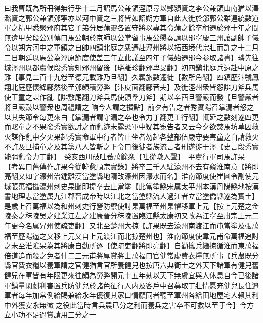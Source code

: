 曰我曹既為所冊得無行乎十二月詔馬公兼領涇原尋以鄭潁資之李公兼領山南猶以澤潞資之郭公兼領邠寜亦以河中資之三將皆如詔朔方軍自此大徙於邠郭公雖連統數道軍之精甲悉聚邠府其它子弟分居蒲靈各置守將以專其令蒲之餘卒稍遷於邠十年之間無遺甲矣段公别傳曰馬公朝於京師以公掌留事馬公懇奏請以邠寜慶三州讓副帥子儀令以朔方河中之軍鎮之自帥四鎮北庭之衆遷赴涇州將以拓西境代宗壯而許之十二月二日朝廷以馬公為涇原節度使盖三年立此議至四年子儀始遷邠今参取諸書】璘先往城涇州以都虞候段秀實知邠州留後【璘離珍翻邠卑旻翻】初四鎭北庭兵遠赴中原之難【事見二百十九卷至德元載難乃旦翻】久羈旅數遷徙【數所角翻】四鎮歷汴虢鳳翔北庭歷懷絳鄜然後至邠頗積勞弊【汴皮面翻鄜音夫】及徙涇州衆皆怨誹刀斧兵馬使王童之謀作亂【誹敷尾翻刀斧兵馬使領羣刀斧】期以辛酉旦警嚴而發【旦警嚴者將旦嚴鼔以警衆也周禮謂之晌今人謂之攅點】前夕有告之者秀實陽召掌漏者怒之以其失節令每更來白【掌漏者謂守漏之卒也令力丁翻更工行翻】輒延之數刻遂四更而曙童之不果發秀實欲討之而亂迹未露恐軍中疑其寃告者又云今夕欲焚馬坊草因救火謀作亂中夕火果起秀實命軍中行者皆止坐者勿起各整部伍嚴守要害童之白請救火不許及旦捕童之及其黨八人皆斬之下令曰後徙者族流言者刑遂徙于涇【史言段秀實能弭亂令力丁翻】　癸亥西川破吐蕃萬餘衆【吐從暾入聲】　平盧行軍司馬許杲　【考異曰舊傳作許果今從韓愈順宗實錄】將卒三千人駐濠州不去有窺淮南意【將即亮翻又如字濠州治鍾離漢當塗縣地隋改濠州因濠水而名】淮南節度使崔圓令副使元城張萬福攝濠州刺史杲聞即提卒去止當塗【此當塗縣宋属太平州本漢丹陽縣地按漢書地理志當塗属九江郡晉成帝時以江北之當塗縣流人過江者立當塗僑縣遂為實土】是歲上召萬福以為和州刺史行營防禦使討杲萬福至州杲懼移軍上元【按上元楚之金陵秦之秣陵吳之建業江左之建康晉分秣陵置臨江縣太康初又改為江寜至肅宗上元二年更今名属昇州使疏吏翻】又北至楚州大掠【許果既去濠州南渡江而屯當塗及張萬福至歷陽逼之又移上元又自上元渡江而北掠楚州也】淮南節度使韋元甫命萬福追討之未至淮隂杲為其將康自勸所逐【使疏吏翻將即亮翻】自勸擁兵繼掠循淮而東萬福倍道追而殺之免者什二三元甫將厚賞將士萬福曰官健常虚費衣糧無所事【兵農既分縣官費衣糧以養軍謂之官健猶言官所養健兒也按唐六典衛士之外天下諸軍有健兒舊健兒在軍皆有年限更來往頗為勞弊開元十五年勑以天下無虞宜與人休息自今已後諸軍鎮量閑劇利害置兵防健兒於諸色征行人内及客戶中召募取丁壯情愿充健兒長住邉軍者每年加常例給賜兼給永年優復其家口情願同者聽至軍州各給田地屋宅人賴其利中外獲安永無徵之役此當時言兵農已分之利而養兵之害卒不可救以至于今】今方立小功不足過賞請用三分之一

